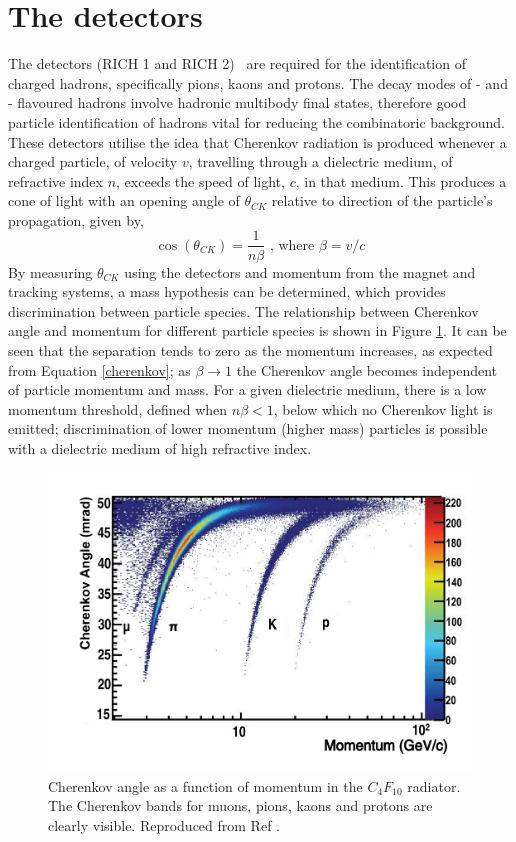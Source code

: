 \section{The \rich detectors}
\label{sec:detector:rich}

The \rich detectors (RICH 1 and RICH 2)~\cite{LHCb-DP-2012-003} are required for the identification of charged hadrons, specifically pions, kaons and protons. The decay modes of \bquark- and \cquark- flavoured hadrons involve hadronic multibody final states, therefore good particle identification of hadrons vital for reducing the combinatoric background. These detectors utilise the idea that Cherenkov radiation is produced whenever a charged particle, of velocity $v$, travelling through a dielectric medium, of refractive index $n$, exceeds the speed of light, $c$, in that medium. This produces a cone of light with an opening angle of $\theta_{CK}$ relative to direction of the particle's propagation, given by,
\begin{equation}
\cos\left(\theta_{CK}\right) = \frac{1}{n\beta} \text{ ,     where }  \beta = v/c
\label{cherenkov}
\end{equation}
By measuring $\theta_{CK}$ using the \rich detectors and momentum from the magnet and tracking systems, a mass hypothesis can be determined, which provides discrimination between particle species. The relationship between Cherenkov angle and momentum for different particle species is shown in Figure \ref{richseparation}. It can be seen that the separation tends to zero as the momentum increases, as expected from Equation \ref{cherenkov}; as $\beta \rightarrow 1$ the Cherenkov angle becomes independent of particle momentum and mass. For a given dielectric medium, there is a low momentum threshold, defined when $n\beta < 1$, below which no Cherenkov light is emitted; discrimination of lower momentum (higher mass) particles is possible with a dielectric medium of high refractive index.

\begin{figure}
\centering
\includegraphics[width=0.8\linewidth]{figures/detector/richseparation.pdf}
\caption{Cherenkov angle as a function of momentum in the $C_{4}F_{10}$ radiator. The Cherenkov bands for muons, pions, kaons and protons are clearly visible. Reproduced from Ref \cite{LHCb-DP-2012-003}.}
\label{richseparation}
\end{figure}

